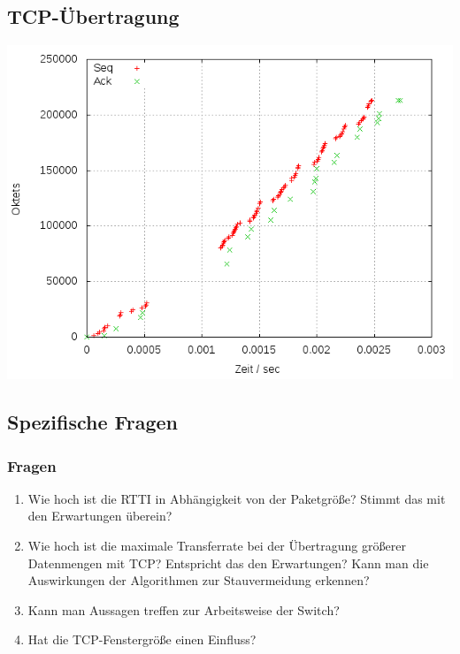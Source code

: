 \documentclass[a4paper,10pt]{article}
\begin{document}
\subsection{TCP-Übertragung}
\includegraphics[scale=0.75]{setup1.png}

\subsection{Spezifische Fragen}
\subsubsection{Fragen}
\begin{enumerate}
 \item Wie hoch ist die RTTI in Abhängigkeit von der Paketgröße? Stimmt das mit den Erwartungen überein?
 \item Wie hoch ist die maximale Transferrate bei der Übertragung größerer Datenmengen mit TCP? Entspricht das den Erwartungen? Kann man die Auswirkungen der Algorithmen zur Stauvermeidung erkennen?
 \item Kann man Aussagen treffen zur Arbeitsweise der Switch?
 \item Hat die TCP-Fenstergröße einen Einfluss?
\end{enumerate}
\end{document}

